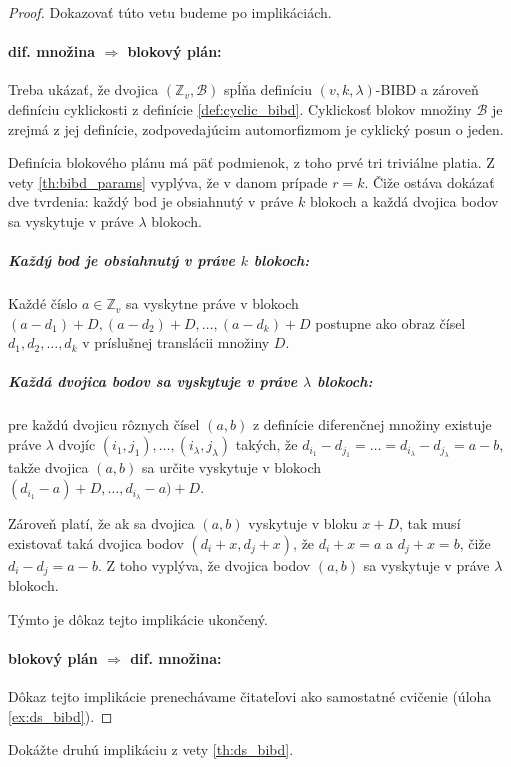 \begin{toreview}
\begin{proof}
Dokazovať túto vetu budeme po implikáciách.
\paragraph{dif. množina $\Longrightarrow$ blokový plán:}
Treba ukázať, že dvojica $(\mathbb{Z}_v, \mathcal{B})$ spĺňa definíciu $(v,k,\lambda)$-BIBD a zároveň definíciu cyklickosti z definície \ref{def:cyclic_bibd}.
Cyklickosť blokov množiny $\mathcal{B}$ je zrejmá z jej definície, zodpovedajúcim automorfizmom je cyklický posun o jeden.

Definícia blokového plánu má päť podmienok, z toho prvé tri triviálne platia. 
Z vety \ref{th:bibd_params} vyplýva, že v danom prípade $r = k$.
Čiže ostáva dokázať dve tvrdenia: každý bod je obsiahnutý v práve $k$ blokoch a každá dvojica bodov sa vyskytuje v práve $\lambda$ blokoch.

\subparagraph{Každý bod je obsiahnutý v práve $k$ blokoch:} Každé číslo $a \in \mathbb{Z}_v$ sa vyskytne práve v blokoch $(a - d_1) + D, (a - d_2) + D, \ldots, (a - d_k) + D$ postupne ako obraz čísel $d_1, d_2, \ldots, d_k$ v príslušnej translácii množiny $D$.

\subparagraph{Každá dvojica bodov sa vyskytuje v práve $\lambda$ blokoch:} pre každú dvojicu rôznych čísel $(a, b)$ z definície diferenčnej množiny existuje práve $\lambda$ dvojíc $(i_1, j_1), \ldots, (i_\lambda, j_\lambda)$ takých, že $d_{i_1} - d_{j_1} = \ldots = d_{i_\lambda} - d_{j_\lambda} = a - b$, takže dvojica $(a, b)$ sa určite vyskytuje v blokoch $(d_{i_1} - a) + D, \ldots, d_{i_\lambda} - a) + D$. 

Zároveň platí, že ak sa dvojica $(a, b)$ vyskytuje v bloku $x + D$, tak musí existovať taká dvojica bodov $(d_i + x, d_j + x)$, že $d_i + x = a$ a $d_j + x = b$, čiže $d_i - d_j = a-b$.
Z toho vyplýva, že dvojica bodov $(a, b)$ sa vyskytuje v práve $\lambda$ blokoch.

Týmto je dôkaz tejto implikácie ukončený.

\paragraph{blokový plán $\Longrightarrow$ dif. množina:}
Dôkaz tejto implikácie prenechávame čitateľovi ako samostatné cvičenie (úloha \ref{ex:ds_bibd}).
\end{proof}

\begin{exercise}
\label{ex:ds_bibd}
Dokážte druhú implikáciu z vety \ref{th:ds_bibd}.
\end{exercise}

\end{toreview}


